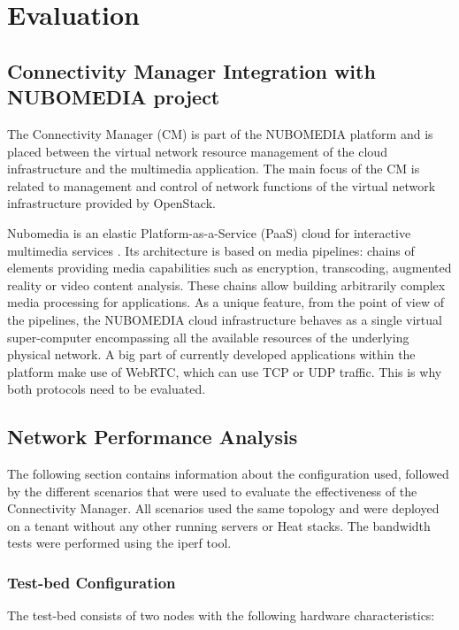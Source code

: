 \chapter{Evaluation}


\section{Connectivity Manager Integration with NUBOMEDIA project}


The Connectivity Manager (CM) is part of the NUBOMEDIA platform and is placed between the virtual network resource management of the cloud infrastructure and the
multimedia application. The main focus of the CM is related to management and control of network functions of the virtual network infrastructure provided by OpenStack.

Nubomedia is an elastic Platform-as-a-Service (PaaS) cloud for interactive multimedia services \cite{nubomedia}. Its architecture is based on media pipelines: chains of elements providing media capabilities such as encryption, transcoding, augmented reality or video content analysis. These chains allow building arbitrarily complex media processing for applications. As a unique feature, from the point of view of the pipelines, the NUBOMEDIA cloud infrastructure behaves as a single virtual super-computer encompassing all the available resources of the underlying physical network. A big part of currently developed applications within the platform make use of WebRTC, which can use TCP or UDP traffic. This is why both protocols need to be evaluated.

\section{Network Performance Analysis}

The following section contains information about the configuration used, followed by the different scenarios that were used to evaluate the effectiveness of the Connectivity Manager. All scenarios used the same topology and were deployed on a tenant without any other running servers or Heat stacks. The bandwidth tests were performed using the iperf tool.

\subsection{Test-bed Configuration}

The test-bed consists of two nodes with the following hardware characteristics:

